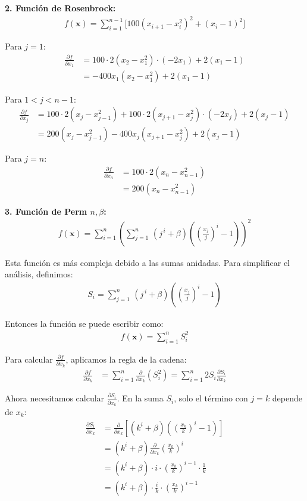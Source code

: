 \documentclass{article}
\begin{document}
\textbf{2. Función de Rosenbrock:}
\begin{align}
f(\mathbf{x}) = \sum_{i=1}^{n-1} \Big[ 100(x_{i+1} - x_i^{2})^{2} + (x_i - 1)^{2} \Big]
\end{align}

Para $j = 1$:
\begin{align}
\frac{\partial f}{\partial x_1} &= 100 \cdot 2(x_2 - x_1^2) \cdot (-2x_1) + 2(x_1 - 1) \\
&= -400x_1(x_2 - x_1^2) + 2(x_1 - 1)
\end{align}

Para $1 < j < n-1$:
\begin{align}
\frac{\partial f}{\partial x_j} &= 100 \cdot 2(x_j - x_{j-1}^2) + 100 \cdot 2(x_{j+1} - x_j^2) \cdot (-2x_j) + 2(x_j - 1) \\
&= 200(x_j - x_{j-1}^2) - 400x_j(x_{j+1} - x_j^2) + 2(x_j - 1)
\end{align}

Para $j = n$:
\begin{align}
\frac{\partial f}{\partial x_n} &= 100 \cdot 2(x_n - x_{n-1}^2) \\
&= 200(x_n - x_{n-1}^2)
\end{align}

\textbf{3. Función de Perm $n,\beta$:}
\begin{align}
f(\mathbf{x}) = \sum_{i=1}^{n} \left( \sum_{j=1}^{n}\,(j^{\,i} + \beta)\left( \left(\frac{x_j}{j}\right)^{i} - 1 \right) \right)^{2}
\end{align}

Esta función es más compleja debido a las sumas anidadas. Para simplificar el análisis, definimos:
\begin{align}
S_i = \sum_{j=1}^{n}\,(j^{\,i} + \beta)\left( \left(\frac{x_j}{j}\right)^{i} - 1 \right)
\end{align}

Entonces la función se puede escribir como:
\begin{align}
f(\mathbf{x}) = \sum_{i=1}^{n} S_i^2
\end{align}

Para calcular $\frac{\partial f}{\partial x_k}$, aplicamos la regla de la cadena:
\begin{align}
\frac{\partial f}{\partial x_k} &= \sum_{i=1}^{n} \frac{\partial}{\partial x_k}(S_i^2) = \sum_{i=1}^{n} 2S_i \frac{\partial S_i}{\partial x_k}
\end{align}

Ahora necesitamos calcular $\frac{\partial S_i}{\partial x_k}$. En la suma $S_i$, solo el término con $j = k$ depende de $x_k$:
\begin{align}
\frac{\partial S_i}{\partial x_k} &= \frac{\partial}{\partial x_k}\left[(k^i + \beta)\left( \left(\frac{x_k}{k}\right)^{i} - 1 \right)\right] \\
&= (k^i + \beta) \frac{\partial}{\partial x_k}\left(\frac{x_k}{k}\right)^{i} \\
&= (k^i + \beta) \cdot i \cdot \left(\frac{x_k}{k}\right)^{i-1} \cdot \frac{1}{k} \\
&= (k^i + \beta) \cdot \frac{i}{k} \cdot \left(\frac{x_k}{k}\right)^{i-1}
\end{align}
\end{document}
